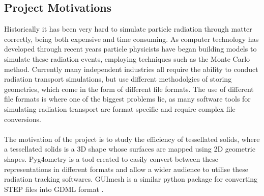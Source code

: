 \documentclass[12pt,a4paper]{article}
\begin{document}

\subsection{Project Motivations}
\label{motiv}
\noindent Historically it has been very hard to simulate particle radiation through matter correctly, being both expensive and time consuming. As computer technology has developed through recent years particle physicists have began building models to simulate these radiation events, employing techniques such as the Monte Carlo method. Currently many independent industries all require the ability to conduct radiation transport simulations, but use different methodolgies of storing geometries, which come in the form of different file formats. The use of different file formats is where one of the biggest problems lie, as many software tools for simulating radiation transport are format specific and require complex file conversions. 
\\\\
The motivation of the project is to study the efficiency of tessellated solids, where a tessellated solids is a 3D shape whose surfaces are mapped using 2D geometric shapes. Pyg4ometry is a tool created to easily convert between these representations in different formats and allow a wider audience to utilise these radiation tracking softwares. GUImesh is a similar python package for converting STEP files into GDML format \cite{meh}.
\end{document}
